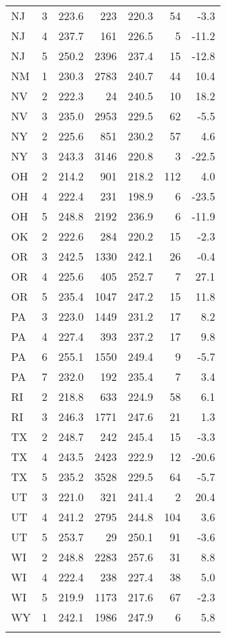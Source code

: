 \begin{longtable}{lcrr@{\extracolsep{10pt}}rr@{\extracolsep{10pt}}r}
  NJ & 3 & 223.6 & 223 & 220.3 & 54 & -3.3 \\ 
  NJ & 4 & 237.7 & 161 & 226.5 &  5 & -11.2 \\ 
  NJ & 5 & 250.2 & 2396 & 237.4 & 15 & -12.8 \\ 
  NM & 1 & 230.3 & 2783 & 240.7 & 44 & 10.4 \\ 
  NV & 2 & 222.3 & 24 & 240.5 & 10 & 18.2 \\ 
  NV & 3 & 235.0 & 2953 & 229.5 & 62 & -5.5 \\ 
  NY & 2 & 225.6 & 851 & 230.2 & 57 & 4.6 \\ 
  NY & 3 & 243.3 & 3146 & 220.8 &  3 & -22.5 \\ 
  OH & 2 & 214.2 & 901 & 218.2 & 112 & 4.0 \\ 
  OH & 4 & 222.4 & 231 & 198.9 &  6 & -23.5 \\ 
  OH & 5 & 248.8 & 2192 & 236.9 &  6 & -11.9 \\ 
  OK & 2 & 222.6 & 284 & 220.2 & 15 & -2.3 \\ 
  OR & 3 & 242.5 & 1330 & 242.1 & 26 & -0.4 \\ 
  OR & 4 & 225.6 & 405 & 252.7 &  7 & 27.1 \\ 
  OR & 5 & 235.4 & 1047 & 247.2 & 15 & 11.8 \\ 
  PA & 3 & 223.0 & 1449 & 231.2 & 17 & 8.2 \\ 
  PA & 4 & 227.4 & 393 & 237.2 & 17 & 9.8 \\ 
  PA & 6 & 255.1 & 1550 & 249.4 &  9 & -5.7 \\ 
  PA & 7 & 232.0 & 192 & 235.4 &  7 & 3.4 \\ 
  RI & 2 & 218.8 & 633 & 224.9 & 58 & 6.1 \\ 
  RI & 3 & 246.3 & 1771 & 247.6 & 21 & 1.3 \\ 
  TX & 2 & 248.7 & 242 & 245.4 & 15 & -3.3 \\ 
  TX & 4 & 243.5 & 2423 & 222.9 & 12 & -20.6 \\ 
  TX & 5 & 235.2 & 3528 & 229.5 & 64 & -5.7 \\ 
  UT & 3 & 221.0 & 321 & 241.4 &  2 & 20.4 \\ 
  UT & 4 & 241.2 & 2795 & 244.8 & 104 & 3.6 \\ 
  UT & 5 & 253.7 & 29 & 250.1 & 91 & -3.6 \\ 
  WI & 2 & 248.8 & 2283 & 257.6 & 31 & 8.8 \\ 
  WI & 4 & 222.4 & 238 & 227.4 & 38 & 5.0 \\ 
  WI & 5 & 219.9 & 1173 & 217.6 & 67 & -2.3 \\ 
  WY & 1 & 242.1 & 1986 & 247.9 &  6 & 5.8 \\ 
  \hline
\label{g4mathCIT1}
\end{longtable}
